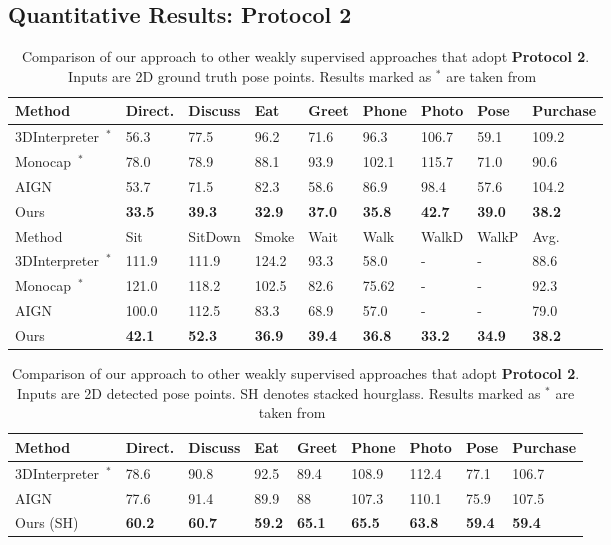 \documentclass[runningheads]{llncs}
\begin{document}
\subsection{Quantitative Results: Protocol 2}\begin{table*}[htb!]
		\caption{Comparison of our approach to other weakly supervised approaches that adopt \textbf{Protocol 2}. Inputs are 2D ground truth pose points. Results marked as $^{\ast}$ are taken from~\cite{Tung_2017_ICCV}}
	\label{table:protocol2_gt}
	\centering
		\begin{tabularx}{\textwidth}{ l *{8}{Y} }
		\toprule
		Method & Direct. & Discuss & Eat & Greet & Phone & Photo & Pose & Purchase \\
		\midrule
		3DInterpreter~\cite{InterpreterNetwork2016}$^{\ast}$ & 56.3 & 77.5 & 96.2 & 71.6 & 96.3 & 106.7 & 59.1 & 109.2\\
		Monocap~\cite{MonoCap}$^{\ast}$&  78.0 & 78.9 & 88.1 & 93.9 & 102.1 & 115.7 & 71.0 & 90.6\\
		AIGN~\cite{Tung_2017_ICCV}  & 53.7 & 71.5 & 82.3 & 58.6 & 86.9 & 98.4 & 57.6 & 104.2 \\
		Ours & {\bf 33.5}&	{\bf 39.3}&	{\bf 32.9}&	{\bf 37.0}&	{\bf 35.8}&	{\bf 42.7}&	{\bf 39.0}&	{\bf 38.2}\\

		\bottomrule
		\toprule	
		Method & Sit & SitDown & Smoke & Wait & Walk & WalkD & WalkP & Avg.\\
		\midrule
		3DInterpreter~\cite{InterpreterNetwork2016}$^{\ast}$ &111.9 & 111.9 & 124.2 & 93.3 & 58.0  & - & - & 88.6 \\
Monocap~\cite{MonoCap}$^{\ast}$ &  121.0 & 118.2 & 102.5 & 82.6 &  75.62 & - & - &  92.3  \\
AIGN~\cite{Tung_2017_ICCV} & 100.0 & 112.5 & 83.3 & 68.9 & 57.0 &  - & - &79.0 \\
Ours & {\bf 42.1}&	{\bf 52.3}&	{\bf 36.9}&	{\bf 39.4} & 	{\bf 36.8} &	{\bf 33.2}	&{\bf 34.9}&	{\bf 38.2}\\
			\bottomrule
\end{tabularx}
\end{table*}\begin{table*}[t]
		\caption{Comparison of our approach to other weakly supervised approaches that adopt \textbf{Protocol 2}. Inputs are 2D detected pose points. SH denotes stacked hourglass. Results marked as $^{\ast}$ are taken from~\cite{Tung_2017_ICCV}}
	\label{table:protocol2_sh}
	\centering
	\begin{tabularx}{\textwidth}{ l *{8}{Y} }
		\toprule
		Method & Direct. & Discuss & Eat & Greet & Phone & Photo & Pose & Purchase \\
		\midrule
		3DInterpreter~\cite{InterpreterNetwork2016}$^{\ast}$ & 78.6 & 90.8 & 92.5 & 89.4 & 108.9 & 112.4 &  77.1 & 106.7 \\
		AIGN~\cite{Tung_2017_ICCV}  &77.6 &  91.4 &  89.9 & 88 & 107.3 & 110.1 &  75.9 &  107.5 \\
		Ours (SH) & \textbf{60.2} &	 {\bf 60.7} &	\textbf{59.2} &	{\bf 65.1} & \textbf{65.5} &	{\bf 63.8}& \textbf{59.4} & \textbf{59.4}\\
		

\end{tabularx}
\end{table*}
\end{document}
